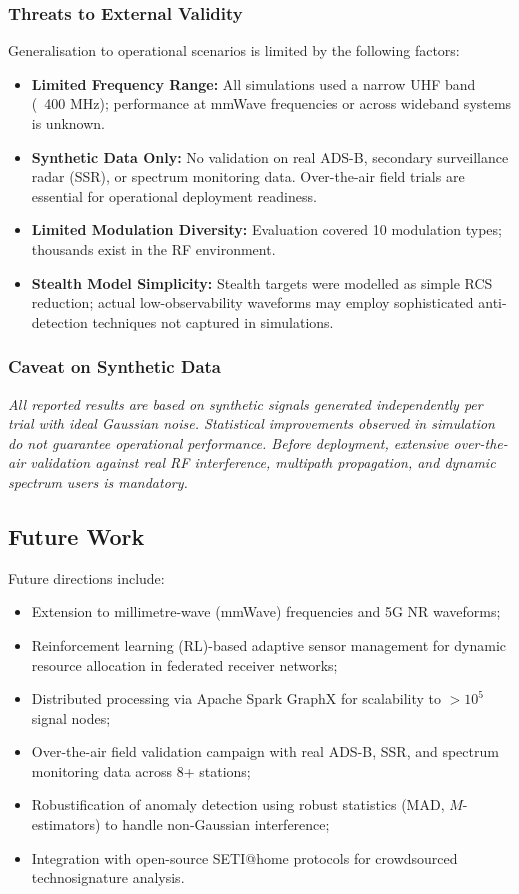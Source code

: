 \documentclass[sensors,article,submit,pdftex]{mdpi}
\begin{document}
\subsubsection{Threats to External Validity}
Generalisation to operational scenarios is limited by the following factors:

\begin{itemize}[nosep,leftmargin=*]
    \item \textbf{Limited Frequency Range:} All simulations used a narrow UHF band (~400 MHz); performance at mmWave frequencies or across wideband systems is unknown.
    \item \textbf{Synthetic Data Only:} No validation on real ADS-B, secondary surveillance radar (SSR), or spectrum monitoring data. Over-the-air field trials are essential for operational deployment readiness.
    \item \textbf{Limited Modulation Diversity:} Evaluation covered 10 modulation types; thousands exist in the RF environment.
    \item \textbf{Stealth Model Simplicity:} Stealth targets were modelled as simple RCS reduction; actual low-observability waveforms may employ sophisticated anti-detection techniques not captured in simulations.
\end{itemize}

\subsubsection{Caveat on Synthetic Data}
\textit{All reported results are based on synthetic signals generated independently per trial with ideal Gaussian noise. Statistical improvements observed in simulation do not guarantee operational performance. Before deployment, extensive over-the-air validation against real RF interference, multipath propagation, and dynamic spectrum users is mandatory.}

\subsection{Future Work}
Future directions include:
\begin{itemize}[nosep,leftmargin=*]
    \item Extension to millimetre-wave (mmWave) frequencies and 5G NR waveforms;
    \item Reinforcement learning (RL)-based adaptive sensor management for dynamic resource allocation in federated receiver networks;
    \item Distributed processing via Apache Spark GraphX for scalability to $>10^5$ signal nodes;
    \item Over-the-air field validation campaign with real ADS-B, SSR, and spectrum monitoring data across 8+ stations;
    \item Robustification of anomaly detection using robust statistics (MAD, $M$-estimators) to handle non-Gaussian interference;
    \item Integration with open-source SETI@home protocols for crowdsourced technosignature analysis.
\end{itemize}
\end{document}
